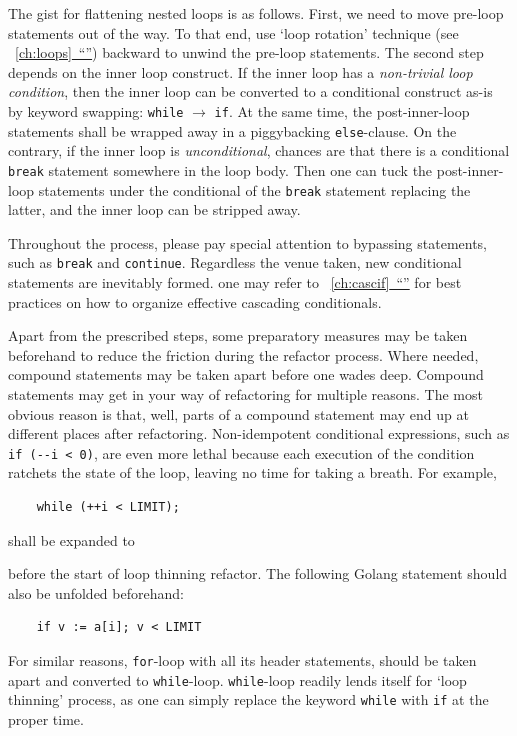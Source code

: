 \documentclass[oneside,11pt]{book}
\theoremstyle{definition}
\theoremstyle{remark}
\newcommand{\code}[1]{\mbox{\lstinline{#1}}}
\newcommand*{\fullref}[1]{\hyperref[{#1}]{\mbox{\autoref*{#1}~}``\nameref*{#1}''}}
\begin{document}
The gist for flattening nested loops is as follows.
First, we need to move pre-loop statements out of the way.
To that end, use `loop rotation' technique (see ~\fullref{ch:loops}) backward
to unwind the pre-loop statements.
The second step depends on the inner loop construct.
If the inner loop has a \emph{non-trivial loop condition}, then the inner loop can
be converted to a conditional construct as-is by keyword swapping: \code{while} $\rightarrow$
\code{if}.
At the same time, the post-inner-loop statements shall be wrapped away in a piggybacking
\code{else}-clause.
On the contrary, if the inner loop is \emph{unconditional}, chances are that
there is a conditional \code{break} statement somewhere in the loop body.
Then one can tuck the post-inner-loop statements under the conditional of the
\code{break} statement replacing the latter, and the inner loop can be stripped away.


Throughout the process, please pay special attention to bypassing statements, such as
\code{break} and \code{continue}.
Regardless the venue taken, new conditional statements are inevitably formed.
one may refer to ~\fullref{ch:cascif} for best practices on how to organize effective
cascading conditionals.



Apart from the prescribed steps, some preparatory measures may be taken beforehand
to reduce the friction during the refactor process.
Where needed, compound statements may be taken apart before one wades deep.
Compound statements may get in your way of refactoring for multiple reasons.
The most obvious reason is that, well, parts of a compound statement
may end up at different places after refactoring.
Non-idempotent conditional expressions, such as \code{if (--i < 0)}, are even more lethal
because each execution of the condition ratchets the state of the loop, leaving no time for
taking a breath.
For example,
\begin{lstlisting}
    while (++i < LIMIT);
\end{lstlisting}
shall be expanded to

before the start of loop thinning refactor.
The following Golang statement should also be unfolded beforehand:
\begin{lstlisting}
    if v := a[i]; v < LIMIT
\end{lstlisting}


For similar reasons, \code{for}-loop with all its header statements, should be taken apart and
converted to \code{while}-loop.
\code{while}-loop readily lends itself for `loop thinning' process, as one can
simply replace the keyword \code{while} with \code{if} at the proper time.
\end{document}
